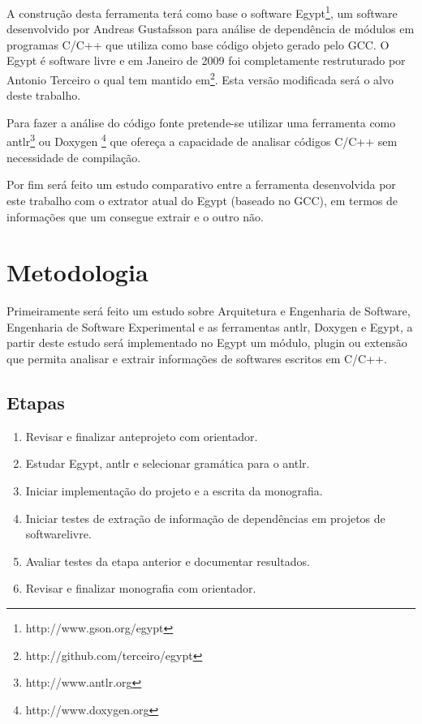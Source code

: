 A construção desta ferramenta terá como base o software
Egypt\footnote{http://www.gson.org/egypt}, um software desenvolvido por Andreas
Gustafsson para análise de dependência de módulos em programas C/C++ que
utiliza como base código objeto gerado pelo GCC. O Egypt é software livre e em
Janeiro de 2009 foi completamente restruturado por Antonio Terceiro o qual tem
mantido em\footnote{http://github.com/terceiro/egypt}. Esta versão modificada
será o alvo deste trabalho.

Para fazer a análise do código fonte pretende-se utilizar uma ferramenta como
antlr\footnote{http://www.antlr.org} ou Doxygen
\footnote{http://www.doxygen.org} que ofereça a capacidade de analisar códigos
C/C++ sem necessidade de compilação.

Por fim será feito um estudo comparativo entre a ferramenta desenvolvida por
este trabalho com o extrator atual do Egypt (baseado no GCC), em termos de
informações que um consegue extrair e o outro não.

\chapter{Metodologia}

Primeiramente será feito um estudo sobre Arquitetura e Engenharia de Software,
Engenharia de Software Experimental e as ferramentas antlr, Doxygen e Egypt, a
partir deste estudo será implementado no Egypt um módulo, plugin ou extensão
que permita analisar e extrair informações de softwares escritos em C/C++.

\section{Etapas}

\begin{enumerate}
\item Revisar e finalizar anteprojeto com orientador.
\item Estudar Egypt, antlr e selecionar gramática para o antlr.
\item Iniciar implementação do projeto e a escrita da monografia.
\item Iniciar testes de extração de informação de dependências em projetos de softwarelivre.
\item Avaliar testes da etapa anterior e documentar resultados.
\item Revisar e finalizar monografia com orientador.
\end{enumerate}

